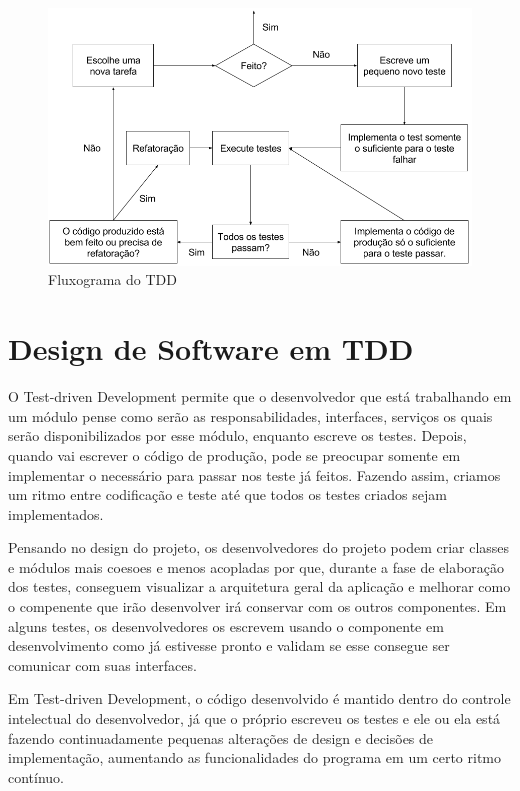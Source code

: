 \documentclass{article}
\begin{document}
  \begin{figure}[H]
    \centering
    \includegraphics[scale=0.4]{tdd}
    \caption{Fluxograma do TDD}
  \end{figure}

  \section{Design de Software em TDD}

  O Test-driven Development permite que o desenvolvedor que está trabalhando 
  em um módulo pense como serão as responsabilidades, interfaces, serviços os 
  quais serão disponibilizados por esse módulo, enquanto escreve os testes. 
  Depois, quando vai escrever o código de produção, pode se preocupar somente em
  implementar o necessário para passar nos teste já feitos. Fazendo assim, 
  criamos um ritmo entre codificação e teste até que todos os testes criados 
  sejam implementados.

  Pensando no design do projeto, os desenvolvedores do projeto podem criar
  classes e módulos mais coesoes e menos acopladas por que, durante a fase de 
  elaboração dos testes, conseguem visualizar a arquitetura geral da aplicação e
  melhorar como o compenente que irão desenvolver irá conservar com os outros 
  componentes. Em alguns testes, os desenvolvedores os escrevem usando o 
  componente em desenvolvimento como já estivesse pronto e validam se
  esse consegue ser comunicar com suas interfaces.

  Em Test-driven Development, o código desenvolvido é mantido dentro do controle
  intelectual do desenvolvedor, já que o próprio escreveu os testes e ele ou 
  ela está fazendo continuadamente pequenas alterações de design e decisões de 
  implementação, aumentando as funcionalidades do programa em um certo ritmo 
  contínuo.
\end{document}
